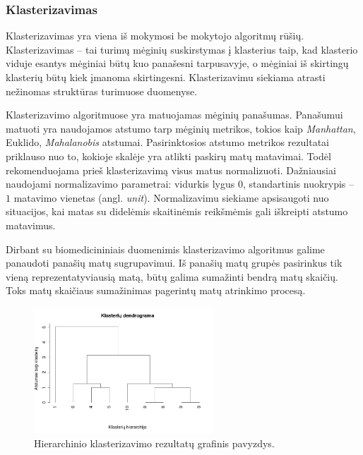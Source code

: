 


\subsubsection{Klasterizavimas}

Klasterizavimas yra viena iš mokymosi be mokytojo algoritmų rūšių. Klasterizavimas -- tai turimų mėginių suskirstymas į klasterius taip, kad klasterio viduje esantys mėginiai būtų kuo panašesni tarpusavyje, o mėginiai iš skirtingų klasterių būtų kiek įmanoma skirtingesni. Klasterizavimu siekiama atrasti nežinomas struktūras turimuose duomenyse. 

Klasterizavimo algoritmuose yra matuojamas mėginių panašumas. Panašumui matuoti yra naudojamos atstumo tarp mėginių metrikos, tokios kaip \textit{Manhattan}, Euklido, \textit{Mahalanobis} atstumai. Pasirinktosios atstumo metrikos rezultatai priklauso nuo to, kokioje skalėje yra atlikti paskirų matų matavimai. Todėl rekomenduojama prieš klasterizavimą visus matus normalizuoti. Dažniausiai naudojami normalizavimo parametrai: vidurkis lygus $0$, standartinis nuokrypis -- $1$ matavimo vienetas (angl. \textit{unit}). Normalizavimu siekiame apsisaugoti nuo situacijos, kai matas su didelėmis skaitinėmis reikšmėmis gali iškreipti atstumo matavimus. 

Dirbant su biomedicininiais duomenimis klasterizavimo algoritmus galime panaudoti panašių matų sugrupavimui. Iš panašių matų grupės pasirinkus tik vieną reprezentatyviausią matą, būtų galima sumažinti bendrą matų skaičių. Toks matų skaičiaus sumažinimas pagerintų matų atrinkimo procesą.

\begin{figure}
 \centering
 \includegraphics[width=0.6\textwidth]{images/hierarchical_clustering.png}
 \caption{Hierarchinio klasterizavimo rezultatų grafinis pavyzdys.}
 \label{fig:hierarchical_clustering}
\end{figure}

